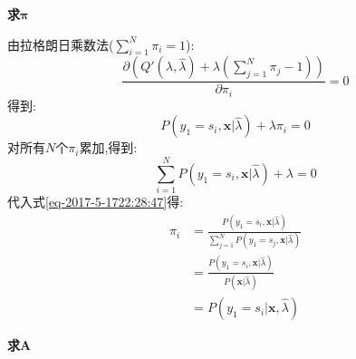 \documentclass[UTF8,a4paper]{ctexart}%
\begin{document}
            \textbf{求$\bm{\pi}$}

            由拉格朗日乘数法($\sum_{i= 1}^N \pi_i = 1$):
            \begin{equation}
              \frac{\partial\left( Q'(\lambda,\hat{\lambda}) + \lambda\left( \sum_{j = 1}^N \pi_j - 1\right) \right)}{\partial \pi_i} = 0
            \end{equation}
            得到:
            \begin{equation}
              P(y_1 = s_i , \bm{x}|\hat{\lambda}) + \lambda \pi_i = 0
              \label{eq-2017-5-1722:28:47}
            \end{equation}
            对所有$N$个$\pi_i$累加,得到:
            \begin{equation}
              \sum_{i = 1}^N P(y_1 = s_i , \bm{x}|\hat{\lambda}) + \lambda = 0
            \end{equation}
            代入式\eqref{eq-2017-5-1722:28:47}得:
            \begin{equation}
              \begin{split}
              \pi_i &= \frac{P(y_1 = s_i , \bm{x}|\hat{\lambda}) }{\sum_{j = 1}^N P(y_1 = s_j , \bm{x}|\hat{\lambda})}\\
              &= \frac{P(y_1 = s_i , \bm{x}|\hat{\lambda}) }{ P( \bm{x}|\hat{\lambda})}\\
              &= P(y_1 = s_i|\bm{x},\hat{\lambda})
              \end{split}
            \end{equation}

            \textbf{求$\bm{A}$}
\end{document}
